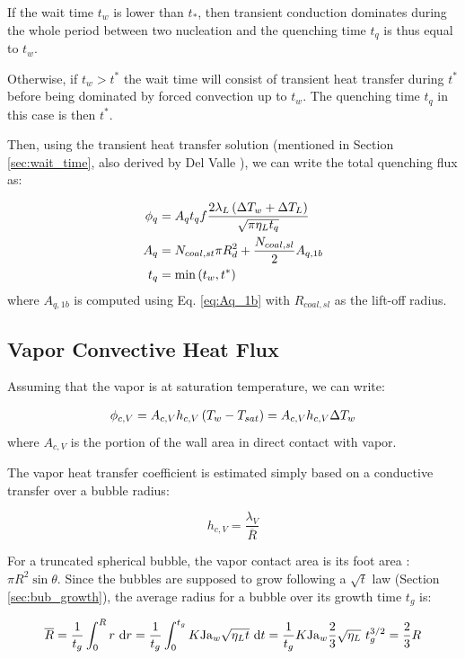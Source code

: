 If the wait time $t_{w}$ is lower than $t_{*}$, then transient conduction dominates during the whole period between two nucleation and the quenching time $t_{q}$ is thus equal to $t_{w}$.

Otherwise, if $t_{w}>t^{*}$ the wait time will consist of transient heat transfer during $t^{*}$ before being dominated by forced convection up to $t_{w}$. The quenching time $t_{q}$ in this case is then $t^{*}$.

Then, using the transient heat transfer solution (mentioned in Section \ref{sec:wait_time}, also derived by Del Valle \cite{delvalle_phd}), we can write the total quenching flux as:

\begin{align}
\phi_{q} &= A_{q}t_{q}f \frac{2\lambda_{L}\left( \Delta T_{w} + \Delta T_{L} \right)}{\sqrt{\pi \eta_{L}t_{q}} }\\
A_{q} &= N_{coal,st} \pi R_{d}^{2} + \frac{N_{coal,sl}}{2} A_{q,1b} \\
t_{q} &= \mathrm{min}\left( t_{w}, t^{*} \right)
\end{align}
where $A_{q,1b}$ is computed using Eq. \ref{eq:Aq_1b} with $R_{coal,sl}$ as the lift-off radius.


\subsection{Vapor Convective Heat Flux}

Assuming that the vapor is at saturation temperature, we can write:

\begin{align}
\phi_{c,V} = A_{c,V} h_{c,V} \left( T_{w}-T_{sat} \right) = A_{c,V} h_{c,V} \Delta T_{w}
\end{align}
where $A_{c,V}$ is the portion of the wall area in direct contact with vapor.

\npar

The vapor heat transfer coefficient is estimated simply based on a conductive transfer over a bubble radius:

\begin{equation}
h_{c,V} = \dfrac{\lambda_{V}}{\overline{R}}
\end{equation}

For a truncated spherical bubble, the vapor contact area is its foot area : $\pi R^{2}\sin{\theta}$. Since the bubbles are supposed to grow following a $\sqrt{t}$ law (Section \ref{sec:bub_growth}), the average radius for a bubble over its growth time $t_{g}$ is:

\begin{equation}
\overline{R} = \frac{1}{t_{g}}\int_{0}^{R}r\ \mathrm{d}r = \frac{1}{t_{g}} \int_{0}^{t_{g}} K\mathrm{Ja}_{w}\sqrt{\eta_{L}t}~\mathrm{d}t = \frac{1}{t_{g}} K\mathrm{Ja}_{w} \frac{2}{3}\sqrt{\eta_{L}}~t_{g}^{3/2} = \frac{2}{3}R
\end{equation}

